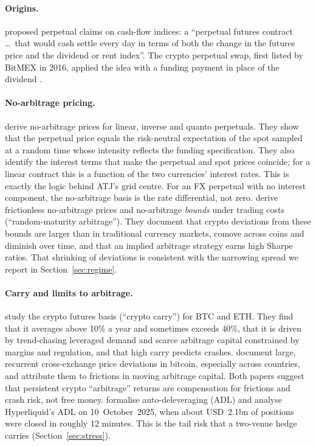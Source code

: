 \documentclass[11pt,a4paper]{article}
\begin{document}
\paragraph{Origins.}
\citet{shiller1993} proposed perpetual claims on cash-flow indices: a ``perpetual futures contract \ldots\ that would cash settle every day in terms of both the change in the futures price and the dividend or rent index''. The crypto perpetual swap, first listed by BitMEX in 2016, applied the idea with a funding payment in place of the dividend \citep{chitra2025adl}.

\paragraph{No-arbitrage pricing.}
\citet{ackerer2026} derive no-arbitrage prices for linear, inverse and quanto perpetuals. They show that the perpetual price equals the risk-neutral expectation of the spot sampled at a random time whose intensity reflects the funding specification. They also identify the interest terms that make the perpetual and spot prices coincide; for a linear contract this is a function of the two currencies' interest rates.
This is exactly the logic behind ATJ's grid centre. For an FX perpetual with no interest component, the no-arbitrage basis is the rate differential, not zero.
\citet{he2022} derive frictionless no-arbitrage prices and no-arbitrage \emph{bounds} under trading costs (``random-maturity arbitrage''). They document that crypto deviations from these bounds are larger than in traditional currency markets, comove across coins and diminish over time, and that an implied arbitrage strategy earns high Sharpe ratios.
That shrinking of deviations is consistent with the narrowing spread we report in Section~\ref{sec:regime}.

\paragraph{Carry and limits to arbitrage.}
\citet{schmeling2023} study the crypto futures basis (``crypto carry'') for BTC and ETH. They find that it averages above 10\% a year and sometimes exceeds 40\%, that it is driven by trend-chasing leveraged demand and scarce arbitrage capital constrained by margins and regulation, and that high carry predicts crashes.
\citet{makarov2020} document large, recurrent cross-exchange price deviations in bitcoin, especially across countries, and attribute them to frictions in moving arbitrage capital.
Both papers suggest that persistent crypto ``arbitrage'' returns are compensation for frictions and crash risk, not free money.
\citet{chitra2025adl} formalise auto-deleveraging (ADL) and analyse Hyperliquid's ADL on 10~October~2025, when about USD~2.1bn of positions were closed in roughly 12 minutes. This is the tail risk that a two-venue hedge carries (Section~\ref{sec:stress}).
\end{document}
